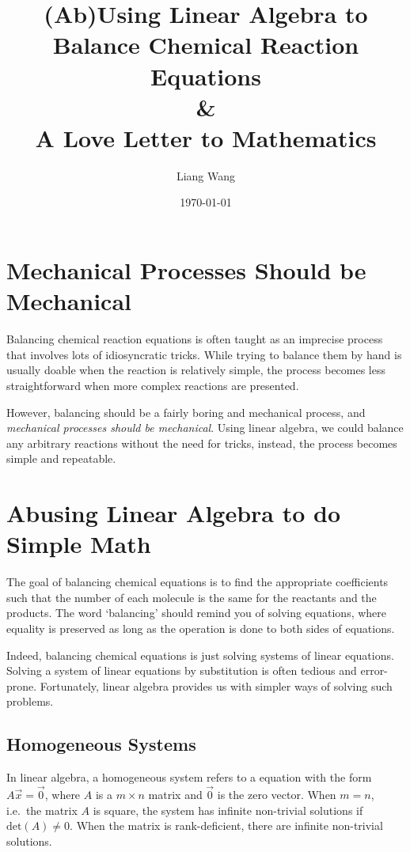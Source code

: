 \documentclass{article}
\begin{document}
	\title{(Ab)Using Linear Algebra to Balance Chemical Reaction Equations \\\& \\  A Love Letter to Mathematics}
	\author{Liang Wang}
	\date{\today}
	\maketitle
	
	\section{Mechanical Processes Should be Mechanical}
	Balancing chemical reaction equations is often taught as an imprecise process that involves lots of idiosyncratic tricks. While trying to balance them by hand is usually doable when the reaction is relatively simple, the process becomes less straightforward when more complex reactions are presented.
	
	However, balancing should be a fairly boring and mechanical process, and \emph{mechanical processes should be mechanical}. Using linear algebra, we could balance any arbitrary reactions without the need for tricks, instead, the process becomes simple and repeatable.
	
	\section{Abusing Linear Algebra to do Simple Math}
	The goal of balancing chemical equations is to find the appropriate coefficients such that the number of each molecule is the same for the reactants and the products. The word `balancing' should remind you of solving equations, where equality is preserved as long as the operation is done to both sides of equations.
	
	Indeed, balancing chemical equations is just solving systems of linear equations. Solving a system of linear equations by substitution is often tedious and error-prone. Fortunately, linear algebra provides us with simpler ways of solving such problems. 
	
	\subsection{Homogeneous Systems}
	In linear algebra, a homogeneous system refers to a equation with the form $A\vec{x} = \vec{0}$, where $A$ is a $m \times n$ matrix and $\vec{0}$ is the zero vector. When $m = n$, i.e.\ the matrix $A$ is square, the system has infinite non-trivial solutions if  $\mathrm{det}(A) \neq 0$. When the matrix is rank-deficient, there are infinite non-trivial solutions. 
	
\end{document}
